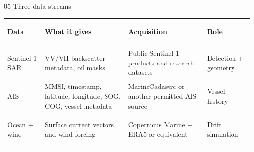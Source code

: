 \documentclass[aspectratio=169,11pt]{beamer}
\begin{document}
\begin{frame}[t]{05 \quad Three data streams}

\vspace{0.05cm}

\begin{center}

\renewcommand{\arraystretch}{1.45}

{\fontsize{8.5}{10.5}\selectfont
\begin{tabular}{
>{\bfseries\raggedright\arraybackslash}p{2.15cm}
>{\raggedright\arraybackslash}p{3.55cm}
>{\raggedright\arraybackslash}p{3.55cm}
>{\raggedright\arraybackslash}p{2.45cm}
}
\toprule
Data & What it gives & Acquisition & Role \\
\midrule

Sentinel-1 SAR &
VV/VH backscatter, metadata, oil masks &
Public Sentinel-1 products and research datasets &
Detection + geometry \\[5pt]

AIS &
MMSI, timestamp, latitude, longitude, SOG, COG, vessel metadata &
MarineCadastre or another permitted AIS source &
Vessel history \\[5pt]

Ocean + wind &
Surface current vectors and wind forcing &
Copernicus Marine + ERA5 or equivalent &
Drift simulation \\

\bottomrule
\end{tabular}
}

\end{center}

\end{frame}
\end{document}

